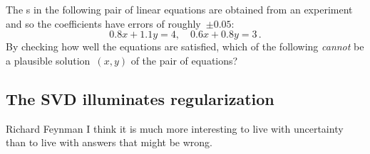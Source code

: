 \begin{activity}
The s in the following pair of linear equations are obtained from an experiment and so the coefficients have errors of roughly~\(\pm0.05\):
\begin{equation*}
0.8x+1.1y=4,\quad 0.6x+0.8y=3\,.
\end{equation*}
By checking how well the equations are satisfied, which of the following \emph{cannot} be a plausible solution~\((x,y)\) of the pair of equations?
\end{activity}






\subsection{The SVD illuminates regularization}
\label{sec:svdir}


\begin{quoted}{Richard Feynman}
I think it is much more interesting to live with uncertainty than to live with answers that might be wrong.
\end{quoted}


